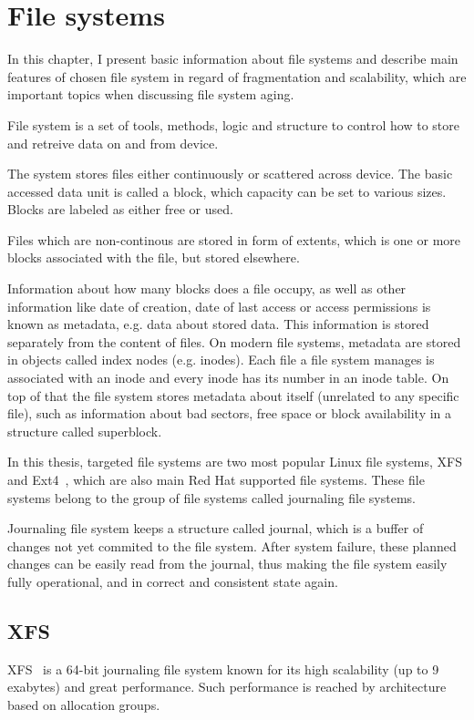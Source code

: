 \documentclass[
  color, %
  table, %
  lof,   %
  lot,   %
]{fithesis3}
\begin{document}


\chapter{File systems}
In this chapter, I present basic information about file systems and describe main features of chosen file system in regard of fragmentation and scalability, which are important topics when discussing file system aging.

File system is a set of tools, methods, logic and structure to control how to store and retreive data on and from device.

The system stores files either continuously or scattered across device. The basic accessed data unit is called a block, which capacity can be set to various sizes. Blocks are labeled as either free or used.

Files which are non-continous are stored in form of extents, which is one or more blocks associated with the file, but stored elsewhere.  

Information about how many blocks does a file occupy, as well as other information like date of creation, date of last access or access permissions is known as metadata, e.g. data about stored data. This information is stored separately from the content of files. On modern file systems, metadata are stored in objects called index nodes (e.g. inodes). Each file a file system manages is associated with an inode and every inode has its number in an inode table. On top of that the file system stores metadata about itself (unrelated to any specific file), such as information about bad sectors, free space or block availability in a structure called superblock.

In this thesis, targeted file systems are two most popular Linux file systems, XFS and Ext4~\cite{Lu:2014:SLF:2578042.2560012}, which are also main Red Hat supported file systems. These file systems belong to the group of file systems called journaling file systems.

Journaling file system keeps a structure called journal, which is a buffer of changes not yet commited to the file system. After system failure, these planned changes can be easily read from the journal, thus making the file system easily fully operational, and in correct and consistent state again.

\section{XFS}
XFS~\cite{xfs:page} is a 64-bit journaling file system known for its high scalability (up to 9 exabytes) and great performance. Such performance is reached by architecture based on allocation groups.
\end{document}
